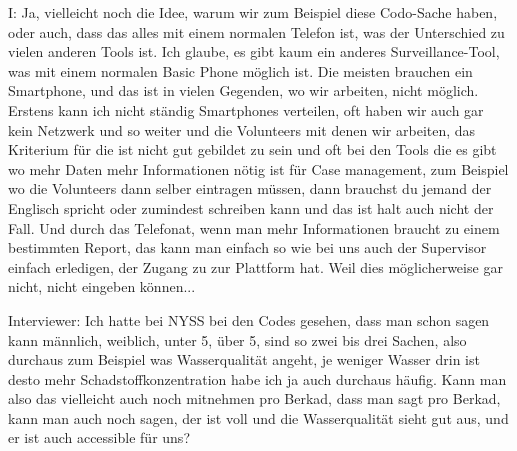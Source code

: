 I: Ja, vielleicht noch die Idee, warum wir zum Beispiel diese Codo-Sache haben, oder auch, dass das alles mit einem normalen Telefon ist, was der Unterschied zu vielen anderen Tools ist. Ich glaube, es gibt kaum ein anderes Surveillance-Tool, was mit einem normalen Basic Phone m{\"o}glich ist. Die meisten brauchen ein Smartphone, und das ist in vielen Gegenden, wo wir arbeiten, nicht m{\"o}glich. Erstens kann ich nicht st{\"a}ndig Smartphones verteilen, oft haben wir auch gar kein Netzwerk und so weiter und die Volunteers mit denen wir arbeiten, das Kriterium f{\"u}r die ist nicht gut gebildet zu sein und oft bei den Tools die es gibt wo mehr Daten mehr Informationen n{\"o}tig ist f{\"u}r Case management, zum Beispiel wo die Volunteers dann selber eintragen m{\"u}ssen, dann brauchst du jemand der Englisch spricht oder zumindest schreiben kann und das ist halt auch nicht der Fall. Und durch das Telefonat, wenn man mehr Informationen braucht zu einem bestimmten Report, das kann man einfach so wie bei uns auch der Supervisor einfach erledigen, der Zugang zu zur Plattform hat. Weil dies m{\"o}glicherweise gar nicht, nicht eingeben k{\"o}nnen... 

Interviewer: Ich hatte bei NYSS bei den Codes gesehen, dass man schon sagen kann m{\"a}nnlich, weiblich, unter 5, {\"u}ber 5, sind so zwei bis drei Sachen, also durchaus zum Beispiel was Wasserqualit{\"a}t angeht, je weniger Wasser drin ist desto mehr Schadstoffkonzentration habe ich ja auch durchaus h{\"a}ufig. Kann man also das vielleicht auch noch mitnehmen pro Berkad, dass man sagt pro Berkad, kann man auch noch sagen, der ist voll und die Wasserqualit{\"a}t sieht gut aus, und er ist auch accessible f{\"u}r uns? 

